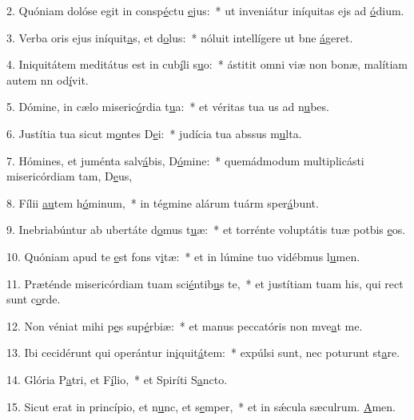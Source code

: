 2. Quóniam dolóse egit in consp\uline{é}ctu \uline{e}jus:~* ut inveniátur iníquitas ejs ad \uline{ó}dium.\par 
3. Verba oris ejus iníquit\uline{a}s, et d\uline{o}lus:~* nóluit intellígere ut bne \uline{á}geret.\par 
4. Iniquitátem meditátus est in cub\uline{í}li s\uline{u}o:~* ástitit omni viæ non bonæ, malítiam autem nn od\uline{í}vit.\par 
5. Dómine, in cælo miseric\uline{ó}rdia t\uline{u}a:~* et véritas tua us ad n\uline{u}bes.\par 
6. Justítia tua sicut m\uline{o}ntes D\uline{e}i:~* judícia tua abssus m\uline{u}lta.\par 
7. Hómines, et juménta salv\uline{á}bis, D\uline{ó}mine:~* quemádmodum multiplicásti misericórdiam tam, D\uline{e}us,\par 
8. Fílii \uline{au}tem h\uline{ó}minum,~* in tégmine alárum tuárm sper\uline{á}bunt.\par 
9. Inebriabúntur ab ubertáte d\uline{o}mus t\uline{u}æ:~* et torrénte voluptátis tuæ potbis \uline{e}os.\par 
10. Quóniam apud te \uline{e}st fons v\uline{i}tæ:~* et in lúmine tuo vidébmus l\uline{u}men.\par 
11. Præténde misericórdiam tuam sci\uline{é}ntib\uline{u}s te,~* et justítiam tuam his, qui rect sunt c\uline{o}rde.\par 
12. Non véniat mihi p\uline{e}s sup\uline{é}rbiæ:~* et manus peccatóris non mve\uline{a}t me.\par 
13. Ibi cecidérunt qui operántur in\uline{i}quit\uline{á}tem:~* expúlsi sunt, nec poturunt st\uline{a}re.\par 
14. Glória P\uline{a}tri, et F\uline{í}lio,~* et Spiríti S\uline{a}ncto.\par 
15. Sicut erat in princípio, et n\uline{u}nc, et s\uline{e}mper,~* et in sǽcula sæculrum. \uline{A}men.\par 
